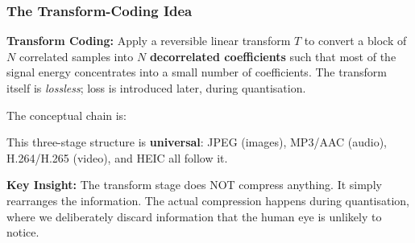 \subsubsection{The Transform-Coding Idea}

\begin{definitionbox}
\textbf{Transform Coding:} Apply a reversible linear transform $T$ to convert a block of $N$ correlated samples into $N$ \textbf{decorrelated coefficients} such that most of the signal energy concentrates into a small number of coefficients. The transform itself is \emph{lossless}; loss is introduced later, during quantisation.
\end{definitionbox}

The conceptual chain is:

\vspace{6pt}
\begin{center}
\end{center}
\vspace{4pt}

This three-stage structure is \textbf{universal}: JPEG (images), MP3/AAC (audio), H.264/H.265 (video), and HEIC all follow it.

\begin{importantbox}
\textbf{Key Insight:} The transform stage does NOT compress anything. It simply rearranges the information. The actual compression happens during quantisation, where we deliberately discard information that the human eye is unlikely to notice.
\end{importantbox}

